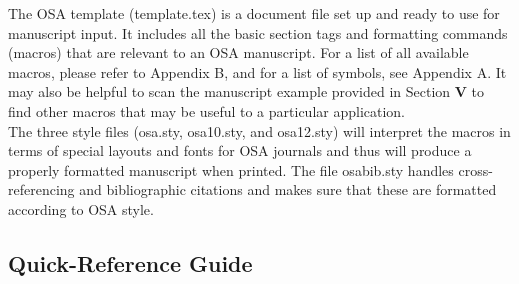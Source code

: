      The OSA template (template.tex) is a document file set up
and ready to use for manuscript input.  It includes all the basic
section tags and formatting commands (macros) that are relevant
to an OSA manuscript.  For a list of all available macros, please
refer to Appendix B, and for a list of symbols, see Appendix A.
It may also be helpful to scan the manuscript example provided in
Section {\bf V} to find other macros that may be useful to a
particular application. \\

     The three style files (osa.sty, osa10.sty, and osa12.sty)
will interpret the macros in terms of special layouts and fonts
for OSA journals and thus will produce a properly formatted
manuscript when printed. The file osabib.sty handles
cross-referencing and bibliographic citations and makes sure
that these are formatted according to OSA style.

\subsection{ Quick-Reference Guide }

